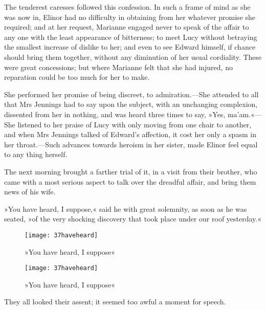 The tenderest caresses followed this confession. In such a frame of mind as she was now in, Elinor had no difficulty in obtaining from her whatever promise she required; and at her request, Marianne engaged never to speak of the affair to any one with the least appearance of bitterness; to meet Lucy without betraying the smallest increase of dislike to her; and even to see Edward himself, if chance should bring them together, without any diminution of her usual cordiality. These were great concessions; but where Marianne felt that she had injured, no reparation could be too much for her to make.

She performed her promise of being discreet, to admiration.—She attended to all that Mrs Jennings had to say upon the subject, with an unchanging complexion, dissented from her in nothing, and was heard three times to say, »Yes, ma’am.«—She listened to her praise of Lucy with only moving from one chair to another, and when Mrs Jennings talked of Edward’s affection, it cost her only a spasm in her throat.—Such advances towards heroism in her sister, made Elinor feel equal to any thing herself.

The next morning brought a farther trial of it, in a visit from their brother, who came with a most serious aspect to talk over the dreadful affair, and bring them news of his wife.

»You have heard, I suppose,« said he with great solemnity, as soon as he was seated, »of the very shocking discovery that took place under our roof yesterday.«



\makeatletter
{}
{%
\begin{figure}[tbph]
	\centering
\texttt{[image: 37haveheard]}
\caption{»You have heard, I suppose«}
\end{figure}
}{%
\begin{figure}[tbph]
\centering
\texttt{[image: 37haveheard]}
\caption{»You have heard, I suppose«}
\end{figure}
}
\makeatother

They all looked their assent; it seemed too awful a moment for speech.

